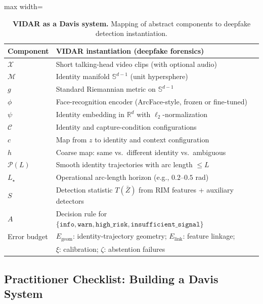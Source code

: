 \documentclass[11pt]{article}
\begin{document}
\begin{table}[t]
    \centering
    \begin{adjustbox}{max width=\linewidth}
    \begin{tabular}{ll}
        \toprule
        Component & VIDAR instantiation (deepfake forensics) \\
        \midrule
        $\mathcal{X}$ & Short talking-head video clips (with optional audio) \\
        $\mathcal{M}$ & Identity manifold $\mathbb{S}^{d-1}$ (unit hypersphere) \\
        $g$ & Standard Riemannian metric on $\mathbb{S}^{d-1}$ \\
        $\phi$ & Face-recognition encoder (ArcFace-style, frozen or fine-tuned) \\
        $\psi$ & Identity embedding in $\mathbb{R}^d$ with $\ell_2$-normalization \\
        $\mathcal{C}$ & Identity and capture-condition configurations \\
        $c$ & Map from $z$ to identity and context configuration \\
        $h$ & Coarse map: same vs.\ different identity vs.\ ambiguous \\
        $\mathcal{P}(L)$ & Smooth identity trajectories with arc length $\le L$ \\
        $L_\star$ & Operational arc-length horizon (e.g., $0.2$--$0.5$ rad) \\
        $S$ & Detection statistic $T(\bar{Z})$ from RIM features + auxiliary detectors \\
        $A$ & Decision rule for $\{\texttt{info},\texttt{warn},\texttt{high\_risk},\texttt{insufficient\_signal}\}$ \\
        Error budget & $E_{\text{geom}}$: identity-trajectory geometry; $E_{\text{link}}$: feature linkage; \\
                     & $\xi$: calibration; $\zeta$: abstention failures \\
        \bottomrule
    \end{tabular}
    \end{adjustbox}
    \caption{\textbf{VIDAR as a Davis system.} Mapping of abstract components to deepfake
    detection instantiation.}
    \label{tab:vidar-davis}
\end{table}

\subsection{Practitioner Checklist: Building a Davis System}
\label{subsec:checklist}
\end{document}
